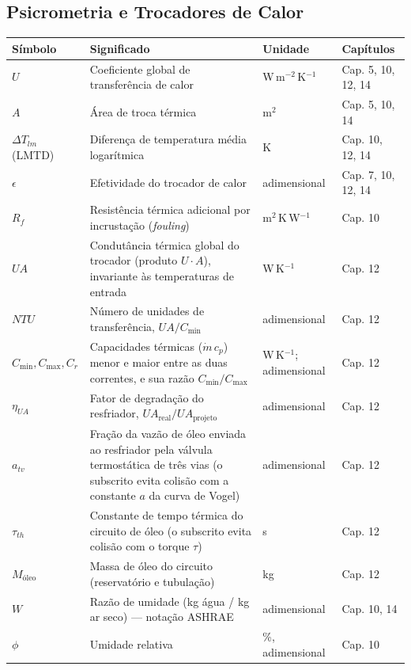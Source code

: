 \documentclass[12pt,a4paper]{article}
\numberwithin{equation}{section}
\numberwithin{table}{section}
\numberwithin{figure}{section}
\begin{document}
{\subsection*{Psicrometria e Trocadores de Calor}
\begin{longtable}{>{\raggedright\arraybackslash}p{2.8cm} >{\raggedright\arraybackslash}p{5.3cm} >{\raggedright\arraybackslash}p{2.1cm} >{\raggedright\arraybackslash}p{4.2cm}}
	\toprule
	\textbf{Símbolo} & \textbf{Significado} & \textbf{Unidade} & \textbf{Capítulos} \\ \midrule
	\endhead
	$U$ & Coeficiente global de transferência de calor & W\,m$^{-2}$\,K$^{-1}$ & Cap. 5, 10, 12, 14 \\
	$A$ & Área de troca térmica & m$^2$ & Cap. 5, 10, 14 \\
	$\Delta T_{lm}$ (LMTD) & Diferença de temperatura média logarítmica & K & Cap. 10, 12, 14 \\
	$\epsilon$ & Efetividade do trocador de calor & adimensional & Cap. 7, 10, 12, 14 \\
	$R_f$ & Resistência térmica adicional por incrustação (\textit{fouling}) & m$^2$\,K\,W$^{-1}$ & Cap. 10 \\
	$UA$ & Condutância térmica global do trocador (produto $U \cdot A$), invariante às temperaturas de entrada & W\,K$^{-1}$ & Cap. 12 \\
	$NTU$ & Número de unidades de transferência, $UA/C_{\min}$ & adimensional & Cap. 12 \\
	$C_{\min}, C_{\max}, C_r$ & Capacidades térmicas ($\dot{m}\,c_p$) menor e maior entre as duas correntes, e sua razão $C_{\min}/C_{\max}$ & W\,K$^{-1}$; adimensional & Cap. 12 \\
	$\eta_{UA}$ & Fator de degradação do resfriador, $UA_{\text{real}}/UA_{\text{projeto}}$ & adimensional & Cap. 12 \\
	$a_{tv}$\dag & Fração da vazão de óleo enviada ao resfriador pela válvula termostática de três vias (o subscrito evita colisão com a constante $a$ da curva de Vogel) & adimensional & Cap. 12 \\
	$\tau_{th}$\dag & Constante de tempo térmica do circuito de óleo (o subscrito evita colisão com o torque $\tau$) & s & Cap. 12 \\
	$M_{\text{óleo}}$ & Massa de óleo do circuito (reservatório e tubulação) & kg & Cap. 12 \\
	$W$\dag & Razão de umidade (kg água / kg ar seco) — notação ASHRAE & adimensional & Cap. 10, 14 \\
	$\phi$ & Umidade relativa & \%, adimensional & Cap. 10 \\

\end{longtable}}
\end{document}

